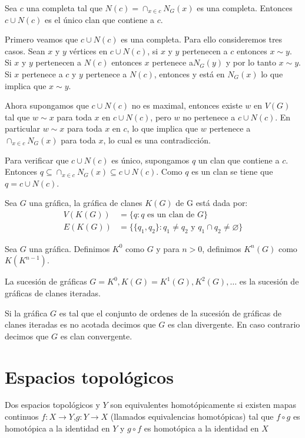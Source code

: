 \begin{Prop}
Sea $c$ una completa tal que $N(c) = \cap_{x\in c}N_G(x)$ es una completa. Entonces $c\cup N(c)$ es el único clan que contiene a $c$.
\end{Prop}
\begin{Dem}
Primero veamos que $c\cup N(c)$ es una completa. Para ello consideremos tres casos. Sean $x$ y $y$ vértices en $c\cup N(c)$, si $x$ y $y$ pertenecen a $c$ entonces $x\sim y$. Si $x$ y $y$ pertenecen a $N(c)$ entonces $x$ pertenece a$ N_G(y)$ y por lo tanto $x\sim y$. Si $x$ pertenece a $c$ y $y$ pertenece a $N(c)$, entonces y está en $N_G(x)$ lo que implica que $x\sim y$. 

Ahora supongamos que $c\cup N(c)$  no es maximal, entonces existe $w$ en $V(G)$ tal que $w\sim x$ para toda $x$ en $c\cup N(c)$, pero $w$ no pertenece a $c\cup N(c)$. En particular $w\sim x$ para toda $x$ en $c$, lo que implica que $w$ pertenece a $\cap_{x\in c}N_G(x)$ para toda $x$, lo cual es una contradicción.

Para verificar que $c\cup N(c)$ es único, supongamos $q$ un clan que contiene a $c$. Entonces $q\subseteq \cap_{x\in c}N_G(x)\subseteq c\cup N(c) $. Como $q$ es un clan se tiene que $q = c\cup N(c)$.
\end{Dem}

\begin{Defi}
Sea $G$ una gráfica, la gráfica de clanes $K(G)$ de G está dada por:
\begin{align*}
V(K(G))&=\{q: q \text{ es un clan de } G\} \\
E(K(G))&=\{\{q_1,q_2\}: q_1\neq q_2 \text{ y } q_1\cap q_2 \neq \varnothing \}
\end{align*}
\end{Defi}

\begin{Defi}
Sea $G$ una gráfica. Definimos $K^{0}$ como $G$ y para $n>0$, definimos $K^n(G)$ como $K(K^{n-1})$.

La sucesión de gráficas $G = K^{0}, K(G) = K^1(G), K^2(G),\ldots$ es la sucesión de gráficas de clanes iteradas. 
\end{Defi}

\begin{Defi}
Si la gráfica $G$ es tal que el conjunto de ordenes de la sucesión de gráficas de clanes iteradas es no acotada decimos que $G$ es clan divergente.
En caso contrario decimos que $G$ es clan convergente.
\end{Defi}
\section{Espacios topológicos}
\begin{Defi}
Dos espacios topológicos  y $Y$ son equivalentes homotópicamente si existen mapas continuos  $f\colon X\rightarrow Y$,$g\colon Y\rightarrow X$ (llamados equivalencias homotópicas) tal que $f\circ g$ es homotópica a la identidad en $Y$ y $g\circ f$ es homotópica a la identidad en $X$
\end{Defi}

